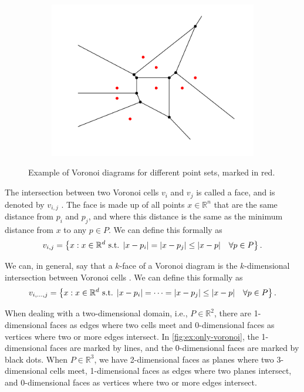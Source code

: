 \begin{figure}[ht]
\begin{subfigure}[b]{0.3\textwidth}
        \includegraphics[width=\textwidth]{report/Images/Theory/voronoi/voronoi_example3.png}
    \end{subfigure}
    \caption[Example of Voronoi diagrams]{Example of Voronoi diagrams for different point sets, marked in red.}
    \label{fig:ex:only-voronoi}
\end{figure}

The intersection between two Voronoi cells $v_i$ and $v_j$ is called a face, and is denoted by $v_{i,j}$ \cite{UPR_chapter}. The face is made up of all points $x \in \mathbb{R}^n$ that are the same distance from $p_i$ and $p_j$, and where this distance is the same as the minimum distance from $x$ to any $p \in P$. We can define this formally as
\begin{equation}
\label{eq:voronoi-face}
    v_{i, j} = \left\{ x : x \in \mathbb{R}^d \text{ s.t. } \lvert x - p_i\rvert = \lvert x - p_j\rvert \leq \lvert x - p\rvert\quad \forall p \in P \right\}.
\end{equation}

We can, in general, say that a $k$-face of a Voronoi diagram is the $k$-dimensional intersection between Voronoi cells \cite{UPR_chapter}. We can define this formally as
\begin{equation}
\label{eq:voronoi-k-faces}
    v_{i,\dots, j} = \left\{ x : x \in \mathbb{R}^d \text{ s.t. } \lvert x - p_i\rvert = \dots = \lvert x - p_j\rvert \leq \lvert x - p\rvert\quad \forall p \in P \right\}.
\end{equation}

When dealing with a two-dimensional domain, i.e., $P \in \mathbb{R}^2$, there are 1-dimensional faces as edges where two cells meet and 0-dimensional faces as vertices where two or more edges intersect. In \autoref{fig:ex:only-voronoi}, the 1-dimensional faces are marked by lines, and the 0-dimensional faces are marked by black dots. When $P \in \mathbb{R}^3$, we have 2-dimensional faces as planes where two 3-dimensional cells meet, 1-dimensional faces as edges where two planes intersect, and 0-dimensional faces as vertices where two or more edges intersect.

